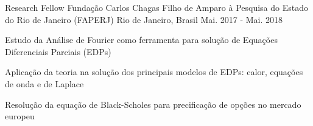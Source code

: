 \begin{cventries}
  \cventry
    {Research Fellow} %
    {Fundação Carlos Chagas Filho de Amparo à Pesquisa do Estado do Rio de Janeiro (FAPERJ)} %
    {Rio de Janeiro, Brasil} %
    {Mai. 2017 - Mai. 2018} %
    {
      \begin{cvitems} %
        \item {Estudo da Análise de Fourier como ferramenta para solução de Equações Diferenciais Parciais (EDPs)}
        \item {Aplicação da teoria na solução dos principais modelos de EDPs: calor, equações de onda e de Laplace}
        \item {Resolução da equação de Black-Scholes para precificação de opções no mercado europeu}
      \end{cvitems}
    }

\end{cventries} 
